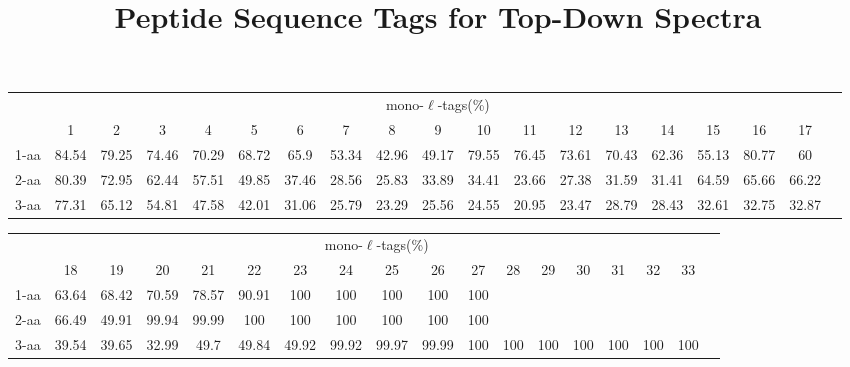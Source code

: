 \documentclass{article}[12pt]
\title{Peptide Sequence Tags for Top-Down Spectra}
\author{}
\begin{document}
\maketitle

\doublespacing
\begin{abstract}


\end{abstract}


\begin{landscape}

\begin{table}[h]\tiny
\vspace{3mm}
{\centering
\begin{center}
\begin{tabular}{|l|c|c|c|c|c|c|c|c|c|c|c|c|c|c|c|c|c|c|}
  \hline
  & \multicolumn{ 17 }{|c|}{mono-$\ell$-tags(\%)} \\
  \cline{2- 18}
    & 1 & 2 & 3 & 4 & 5 & 6 & 7 & 8 & 9 & 10 & 11 & 12 & 13 & 14 & 15 & 16 & 17\\
  \hline
1-aa  & 84.54 & 79.25 & 74.46 & 70.29 & 68.72 & 65.9 & 53.34 & 42.96 & 49.17 & 79.55 & 76.45 & 73.61 & 70.43 & 62.36 & 55.13 & 80.77 & 60\\
2-aa  & 80.39 & 72.95 & 62.44 & 57.51 & 49.85 & 37.46 & 28.56 & 25.83 & 33.89 & 34.41 & 23.66 & 27.38 & 31.59 & 31.41 & 64.59 & 65.66 & 66.22\\
3-aa  & 77.31 & 65.12 & 54.81 & 47.58 & 42.01 & 31.06 & 25.79 & 23.29 & 25.56 & 24.55 & 20.95 & 23.47 & 28.79 & 28.43 & 32.61 & 32.75 & 32.87\\
 \hline
\end{tabular}
\end{center}
\par}
\centering

\vspace{3mm}
\end{table}
\begin{table}[h]\tiny
\vspace{3mm}
{\centering
\begin{center}
\begin{tabular}{|l|c|c|c|c|c|c|c|c|c|c|c|c|c|c|c|c|c|}
  \hline
  & \multicolumn{ 16 }{|c|}{mono-$\ell$-tags(\%)} \\
  \cline{2- 17}
    & 18 & 19 & 20 & 21 & 22 & 23 & 24 & 25 & 26 & 27 & 28 & 29 & 30 & 31 & 32 & 33\\
  \hline
1-aa  & 63.64 & 68.42 & 70.59 & 78.57 & 90.91 & 100 & 100 & 100 & 100 & 100 &  &  &  &  &  & \\
2-aa  & 66.49 & 49.91 & 99.94 & 99.99 & 100 & 100 & 100 & 100 & 100 & 100 &  &  &  &  &  & \\
3-aa  & 39.54 & 39.65 & 32.99 & 49.7 & 49.84 & 49.92 & 99.92 & 99.97 & 99.99 & 100 & 100 & 100 & 100 & 100 & 100 & 100\\
 \hline
\end{tabular}
\end{center}
\par}
\centering


\end{table}
\end{landscape}
\end{document}
